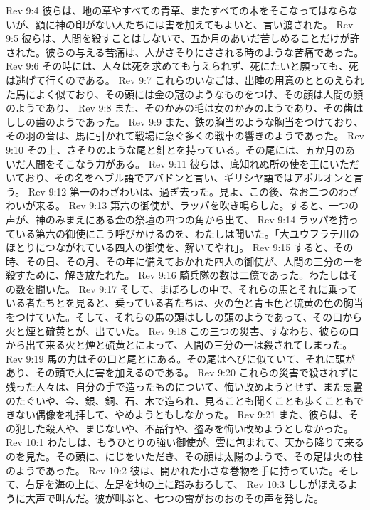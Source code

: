 Rev 9:4  彼らは、地の草やすべての青草、またすべての木をそこなってはならないが、額に神の印がない人たちには害を加えてもよいと、言い渡された。
Rev 9:5  彼らは、人間を殺すことはしないで、五か月のあいだ苦しめることだけが許された。彼らの与える苦痛は、人がさそりにさされる時のような苦痛であった。
Rev 9:6  その時には、人々は死を求めても与えられず、死にたいと願っても、死は逃げて行くのである。
Rev 9:7  これらのいなごは、出陣の用意のととのえられた馬によく似ており、その頭には金の冠のようなものをつけ、その顔は人間の顔のようであり、
Rev 9:8  また、そのかみの毛は女のかみのようであり、その歯はししの歯のようであった。
Rev 9:9  また、鉄の胸当のような胸当をつけており、その羽の音は、馬に引かれて戦場に急ぐ多くの戦車の響きのようであった。
Rev 9:10  その上、さそりのような尾と針とを持っている。その尾には、五か月のあいだ人間をそこなう力がある。
Rev 9:11  彼らは、底知れぬ所の使を王にいただいており、その名をヘブル語でアバドンと言い、ギリシヤ語ではアポルオンと言う。
Rev 9:12  第一のわざわいは、過ぎ去った。見よ、この後、なお二つのわざわいが来る。
Rev 9:13  第六の御使が、ラッパを吹き鳴らした。すると、一つの声が、神のみまえにある金の祭壇の四つの角から出て、
Rev 9:14  ラッパを持っている第六の御使にこう呼びかけるのを、わたしは聞いた。「大ユウフラテ川のほとりにつながれている四人の御使を、解いてやれ」。
Rev 9:15  すると、その時、その日、その月、その年に備えておかれた四人の御使が、人間の三分の一を殺すために、解き放たれた。
Rev 9:16  騎兵隊の数は二億であった。わたしはその数を聞いた。
Rev 9:17  そして、まぼろしの中で、それらの馬とそれに乗っている者たちとを見ると、乗っている者たちは、火の色と青玉色と硫黄の色の胸当をつけていた。そして、それらの馬の頭はししの頭のようであって、その口から火と煙と硫黄とが、出ていた。
Rev 9:18  この三つの災害、すなわち、彼らの口から出て来る火と煙と硫黄とによって、人間の三分の一は殺されてしまった。
Rev 9:19  馬の力はその口と尾とにある。その尾はへびに似ていて、それに頭があり、その頭で人に害を加えるのである。
Rev 9:20  これらの災害で殺されずに残った人々は、自分の手で造ったものについて、悔い改めようとせず、また悪霊のたぐいや、金、銀、銅、石、木で造られ、見ることも聞くことも歩くこともできない偶像を礼拝して、やめようともしなかった。
Rev 9:21  また、彼らは、その犯した殺人や、まじないや、不品行や、盗みを悔い改めようとしなかった。
Rev 10:1  わたしは、もうひとりの強い御使が、雲に包まれて、天から降りて来るのを見た。その頭に、にじをいただき、その顔は太陽のようで、その足は火の柱のようであった。
Rev 10:2  彼は、開かれた小さな巻物を手に持っていた。そして、右足を海の上に、左足を地の上に踏みおろして、
Rev 10:3  ししがほえるように大声で叫んだ。彼が叫ぶと、七つの雷がおのおのその声を発した。
